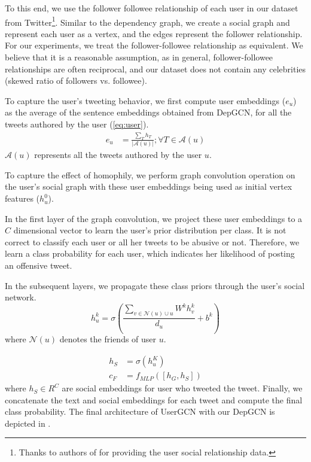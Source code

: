 To this end, we use the follower followee relationship of each user in our dataset from Twitter\footnote{Thanks to authors of \cite{mishra2019abusive} for providing the user social relationship data.}. Similar to the dependency graph, we create a social graph and represent each user as a vertex, and the edges represent the follower relationship. For our experiments, we treat the follower-followee relationship as equivalent. We believe that it is a reasonable assumption, as in general, follower-followee relationships are often reciprocal, and our dataset does not contain any celebrities (skewed ratio of followers vs. followee).

To capture the user's tweeting behavior, we first compute user embeddings ($e_u$) as the average of the sentence embeddings obtained from DepGCN, for all the tweets authored by the user (\cref{eq:user}).
\begin{align}
\label{eq:user}
    e_u &= \frac {\sum_T h_T} {\vert \mathcal{A}(u) \vert}; \forall T \in \mathcal{A}(u)
\end{align}
$\mathcal{A}(u)$ represents all the tweets authored by the user $u$.

To capture the effect of homophily, we perform graph convolution operation on the user's social graph with these user embeddings being used as initial vertex features ($h_u^0$).

In the first layer of the graph convolution, we project these user embeddings to a $C$ dimensional vector to learn the user's prior distribution per class. It is not correct to classify each user or all her tweets to be abusive or not. Therefore, we learn a class probability for each user, which indicates her likelihood of posting an offensive tweet.

In the subsequent layers, we propagate these class priors through the user's social network.
\begin{equation}
    h_u^k = \sigma \left ( \frac{ \sum_{v \in \mathcal{N}(u) \cup u} W^k h_v^k} {d_u} + b^k  \right )
\end{equation}
where $\mathcal{N}(u)$ denotes the friends of user $u$.

\begin{align}
    h_S &= \sigma (h_u^K) \\
    c_F &= f_{MLP}( [h_G, h_S] )
\end{align}
where $h_S \in R^C$ are social embeddings for user who tweeted the tweet.
Finally, we concatenate the text and social embeddings for each tweet and compute the final class probability.
The final architecture of UserGCN with our DepGCN is depicted in .

